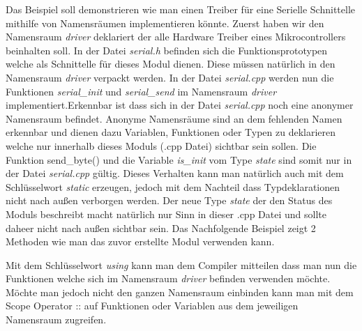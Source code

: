 \documentclass[MES,Master,ngerman]{twbook}%
\begin{document}
\begin{figure}[!htb]
	\begin{subfigure}[b]{0.5\textwidth}
		
		\label{fig:15}
	\end{subfigure}
	\begin{subfigure}[b]{0.5\textwidth}
		
		\label{fig:16}
	\end{subfigure}
\end{figure}
\newpage
Das Beispiel soll demonstrieren wie man einen Treiber für eine Serielle Schnittelle mithilfe von Namensräumen implementieren könnte. Zuerst haben wir den Namensraum \textit{driver} deklariert der alle Hardware Treiber eines Mikrocontrollers beinhalten soll. In der Datei \textit{serial.h} befinden sich die Funktionsprototypen welche als Schnittelle für dieses Modul dienen. Diese müssen natürlich in den Namensraum \textit{driver} verpackt werden. In der Datei \textit{serial.cpp} werden nun die Funktionen \textit{serial\_init} und \textit{serial\_send} im Namensraum \textit{driver} implementiert.\newline \newline Erkennbar ist dass sich in der Datei \textit{serial.cpp} noch eine anonymer Namensraum befindet. Anonyme Namensräume sind an dem fehlenden Namen erkennbar und dienen dazu Variablen, Funktionen oder Typen zu deklarieren welche nur innerhalb dieses Moduls (.cpp Datei) sichtbar sein sollen. Die Funktion send\_byte() und die Variable \textit{is\_init} vom Type \textit{state} sind somit nur in der Datei \textit{serial.cpp} gültig. Dieses Verhalten kann man natürlich auch mit dem Schlüsselwort \textit{static} erzeugen, jedoch mit dem Nachteil dass Typdeklarationen nicht nach außen verborgen werden. Der neue Type \textit{state} der den Status des Moduls beschreibt macht natürlich nur Sinn in dieser .cpp Datei und sollte daheer nicht nach außen sichtbar sein. Das Nachfolgende Beispiel zeigt 2 Methoden wie man das zuvor erstellte Modul verwenden kann.

\begin{figure}[!htb]
	\begin{subfigure}[b]{0.5\textwidth}
		
		\label{fig:17}
	\end{subfigure}
	\begin{subfigure}[b]{0.5\textwidth}
		
		\label{fig:18}
	\end{subfigure}
\end{figure}
Mit dem Schlüsselwort \textit{using} kann man dem Compiler mitteilen dass man nun die Funktionen welche sich im Namensraum \textit{driver} befinden verwenden möchte. Möchte man jedoch nicht den ganzen Namensraum einbinden kann man mit dem Scope Operator :: auf Funktionen oder Variablen aus dem jeweiligen Namensraum zugreifen.
\end{document}
